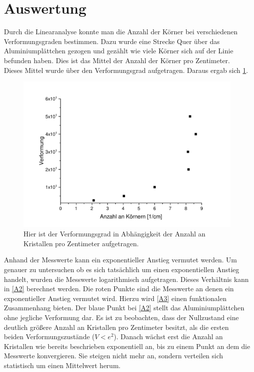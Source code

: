 \documentclass[
	a4paper,
	12pt,
	pagesize,
	ngerman
]{scrartcl}
\begin{document}
\section{Auswertung}
Durch die Linearanalyse konnte man die Anzahl der Körner bei verschiedenen Verformungsgraden bestimmen. Dazu wurde eine Strecke Quer über das Aluminiumplättchen gezogen und gezählt wie viele Körner sich auf der Linie befunden haben. Dies ist das Mittel der Anzahl der Körner pro Zentimeter. 
Dieses Mittel wurde über den Verformungsgrad aufgetragen.
Daraus ergab sich \cref{A1}.
\begin{figure}[h!]
    \centering
    \includegraphics[scale = 0.6]{A1.pdf}
    \caption{Hier ist der Verformungsgrad in Abhängigkeit der Anzahl an Kristallen pro Zentimeter aufgetragen.}
    \label{A1}
\end{figure}
Anhand der Messwerte kann ein exponentieller Anstieg vermutet werden. Um genauer zu untersuchen ob es sich tatsächlich um einen exponentiellen Anstieg handelt, wurden die Messwerte logarithmisch aufgetragen. Dieses Verhältnis kann in \cref{A2} berechnet werden. Die roten Punkte sind die Messwerte an denen ein exponentieller Anstieg vermutet wird. Hierzu wird \cref{A3} einen funktionalen Zusammenhang bieten. Der blaue Punkt bei \cref{A2} stellt das Aluminiumplättchen ohne jegliche Verformung dar. Es ist zu beobachten, dass der Nullzustand eine deutlich größere Anzahl an Kristallen pro Zentimeter besitzt, als die ersten beiden Verformungszustände ($V<e^2$). Danach wächst erst die Anzahl an Kristallen wie bereits beschrieben exponentiell an, bis zu einem Punkt an dem die Messwerte konvergieren. Sie steigen nicht mehr an, sondern verteilen sich statistisch um einen Mittelwert herum.
\end{document}
